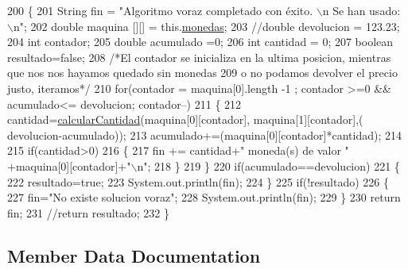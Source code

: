 \begin{DoxyCode}
200                                            \{
201         String fin = \textcolor{stringliteral}{"Algoritmo voraz completado con éxito. \(\backslash\)n Se han usado: \(\backslash\)n"};
202         \textcolor{keywordtype}{double} maquina [][] = this.\mbox{\hyperlink{classalgoritmia2_1_1_algoritmos_a7c670acfc4ef3b85c2e6908773014a13}{monedas}};
203         \textcolor{comment}{//double devolucion = 123.23;}
204         \textcolor{keywordtype}{int} contador;
205         \textcolor{keywordtype}{double} acumulado =0;
206         \textcolor{keywordtype}{int} cantidad = 0;
207         \textcolor{keywordtype}{boolean} resultado=\textcolor{keyword}{false};
208         \textcolor{comment}{/*El contador se inicializa en la ultima posicion, mientras que nos nos hayamos quedado sin monedas
       }
209 \textcolor{comment}{         o no podamos devolver el precio justo, iteramos*/}
210         \textcolor{keywordflow}{for}(contador = maquina[0].length -1 ; contador >=0 && acumulado<= devolucion; contador--)
211             \{
212                cantidad=\mbox{\hyperlink{classalgoritmia2_1_1_algoritmos_ae8d80e3ad2158cb6743bafa0ebbbe3bb}{calcularCantidad}}(maquina[0][contador], maquina[1][contador],(
      devolucion-acumulado));
213                acumulado+=(maquina[0][contador]*cantidad);
214                
215                \textcolor{keywordflow}{if}(cantidad>0)
216                \{
217                    fin += cantidad+\textcolor{stringliteral}{" moneda(s) de valor "} +maquina[0][contador]+\textcolor{stringliteral}{"\(\backslash\)n"}; 
218                \}
219             \}
220         \textcolor{keywordflow}{if}(acumulado==devolucion)
221         \{
222             resultado=\textcolor{keyword}{true};
223             System.out.println(fin);
224         \}
225         \textcolor{keywordflow}{if}(!resultado)
226         \{
227             fin=\textcolor{stringliteral}{"No existe solucion voraz"};
228             System.out.println(fin);
229         \}
230         \textcolor{keywordflow}{return} fin;
231         \textcolor{comment}{//return resultado;}
232     \}
\end{DoxyCode}


\subsection{Member Data Documentation}
\mbox{\label{classalgoritmia2_1_1_algoritmos_a87404a6d3320e8a55fbca88378c43340}} 
